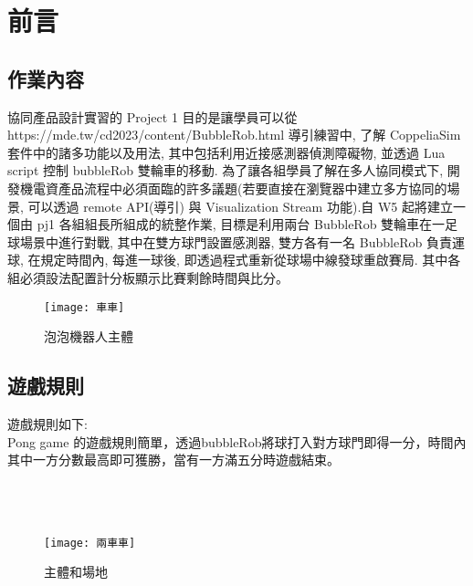 \chapter{前言}
\renewcommand{\baselinestretch}{10.0} %
\setcounter{page}{1}  %
\fontsize{14pt}{2.5pt}\sectionef
\section{作業內容}
協同產品設計實習的 Project 1 目的是讓學員可以從 \\
https://mde.tw/cd2023/content/BubbleRob.html 導引練習中, 了解 CoppeliaSim 套件中的諸多功能以及用法, 其中包括利用近接感測器偵測障礙物, 並透過 Lua script 控制 bubbleRob 雙輪車的移動. 為了讓各組學員了解在多人協同模式下, 開發機電資產品流程中必須面臨的許多議題(若要直接在瀏覽器中建立多方協同的場景, 可以透過 remote API(導引) 與 Visualization Stream 功能).自 W5 起將建立一個由 pj1 各組組長所組成的統整作業, 目標是利用兩台 BubbleRob 雙輪車在一足球場景中進行對戰, 其中在雙方球門設置感測器, 雙方各有一名 BubbleRob 負責運球, 在規定時間內, 每進一球後, 即透過程式重新從球場中線發球重啟賽局. 其中各組必須設法配置計分板顯示比賽剩餘時間與比分。\\

\begin{figure}[hbt!]
\begin{center}
\texttt{[image: 車車]}
\caption{\Large 泡泡機器人主體 }
\label{泡泡機器人主體}
\end{center}
\end{figure}


\section{遊戲規則}
遊戲規則如下:\\

Pong game 的遊戲規則簡單，透過bubbleRob將球打入對方球門即得一分，時間內其中一方分數最高即可獲勝，當有一方滿五分時遊戲結束。
\\
\\
\\
\\
   
\begin{figure}[hbt!]
\begin{center}
\texttt{[image: 兩車車]}
\caption{\Large 主體和場地}
\label{主體和場地 }
\end{center}
\end{figure}
\newpage


